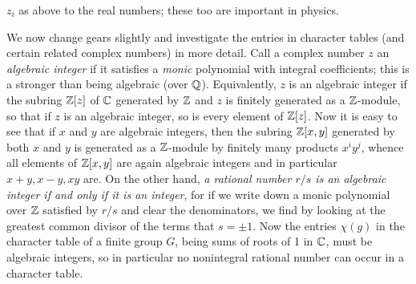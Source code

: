 $z_i$ as above to the real numbers; these too are important in physics.

We now change gears slightly and investigate the entries in character tables (and certain related complex numbers) in more detail.  Call a complex number $z$ an {\sl algebraic integer} if it satisfies a
{\sl monic} polynomial with integral coefficients; this is a stronger than being algebraic (over
$\Bbb Q$).  Equivalently, $z$ is an algebraic integer if the subring $\Bbb Z[z]$ of $\Bbb C$ generated by $\Bbb Z$ and $z$ is finitely generated as a $\Bbb Z$-module, so that if $z$ is an algebraic integer, so is every element of $\Bbb Z[z]$.  Now it is easy to see that if $x$ and $y$ are algebraic integers, then the subring $\Bbb Z[x,y]$ generated by both $x$ and $y$ is generated as a $\Bbb Z$-module by finitely many products $x^i y^j$, whence all elements of $\Bbb Z[x,y]$ are again algebraic integers and in particular $x+y,x-y,xy$ are.  On the other hand, {\sl a rational number $r/s$ is an algebraic integer if and only if it is an integer}, for if we write down a monic polynomial over $\Bbb Z$ satisfied by $r/s$ and clear the denominators, we find by looking at the greatest common divisor of the terms
that $s=\pm1$.  Now the entries $\chi(g)$ in the character table of a finite group $G$, being sums of roots of 1 in $\Bbb C$, must be algebraic integers, so in particular no nonintegral rational number can occur in a character table.  

